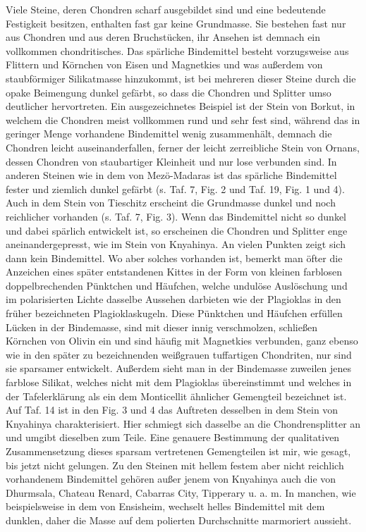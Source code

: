 \documentclass[a4paper, 11pt, oneside, polutonikogreek, german]{article}
\begin{document}
Viele Steine, deren Chondren scharf ausgebildet sind und eine bedeutende Festigkeit besitzen, enthalten fast gar keine Grundmasse. Sie bestehen fast nur aus Chondren und aus deren Bruchstücken, ihr Ansehen ist demnach ein vollkommen chondritisches. Das spärliche Bindemittel besteht vorzugsweise aus Flittern und Körnchen von Eisen und Magnetkies und was außerdem von staubförmiger Silikatmasse hinzukommt, ist bei mehreren dieser Steine durch die opake Beimengung dunkel gefärbt, so dass die Chondren und Splitter umso deutlicher hervortreten. Ein ausgezeichnetes Beispiel ist der Stein von Borkut, in welchem die Chondren meist vollkommen rund und sehr fest sind, während das in geringer Menge vorhandene Bindemittel wenig zusammenhält, demnach die Chondren leicht auseinanderfallen, ferner der leicht zerreibliche Stein von Ornans, dessen Chondren von staubartiger Kleinheit und nur lose verbunden sind. In anderen Steinen wie in dem von Mezö-Madaras ist das spärliche Bindemittel fester und ziemlich dunkel gefärbt (s. Taf. 7, Fig. 2 und Taf. 19, Fig. 1 und 4). Auch in dem Stein von Tieschitz erscheint die Grundmasse dunkel und noch reichlicher vorhanden (s. Taf. 7, Fig. 3). Wenn das Bindemittel nicht so dunkel und dabei spärlich entwickelt ist, so erscheinen die Chondren und Splitter enge aneinandergepresst, wie im Stein von Knyahinya. An vielen Punkten zeigt sich dann kein Bindemittel. Wo aber solches vorhanden ist, bemerkt man öfter die Anzeichen eines später entstandenen Kittes in der Form von kleinen farblosen doppelbrechenden Pünktchen und Häufchen, welche undulöse Auslöschung und im polarisierten Lichte dasselbe Aussehen darbieten wie der Plagioklas in den früher bezeichneten Plagioklaskugeln. Diese Pünktchen und Häufchen erfüllen Lücken in der Bindemasse, sind mit dieser innig verschmolzen, schließen Körnchen von Olivin ein und sind häufig mit Magnetkies verbunden, ganz ebenso wie in den später zu bezeichnenden weißgrauen tuffartigen Chondriten, nur sind sie sparsamer entwickelt. Außerdem sieht man in der Bindemasse zuweilen jenes farblose Silikat, welches nicht mit dem Plagioklas übereinstimmt und welches in der Tafelerklärung als ein dem Monticellit ähnlicher Gemengteil bezeichnet ist. Auf Taf. 14 ist in den Fig. 3 und 4 das Auftreten desselben in dem Stein von Knyahinya charakterisiert. Hier schmiegt sich dasselbe an die Chondrensplitter an und umgibt dieselben zum Teile. Eine genauere Bestimmung der qualitativen Zusammensetzung dieses sparsam vertretenen Gemengteilen ist mir, wie gesagt, bis jetzt nicht gelungen. Zu den Steinen mit hellem festem aber nicht reichlich vorhandenem Bindemittel gehören außer jenem von Knyahinya auch die von Dhurmsala, Chateau Renard, Cabarras City, Tipperary u. a. m. In manchen, wie beispielsweise in dem von Ensisheim, wechselt helles Bindemittel mit dem dunklen, daher die Masse auf dem polierten Durchschnitte marmoriert aussieht.
\end{document}

